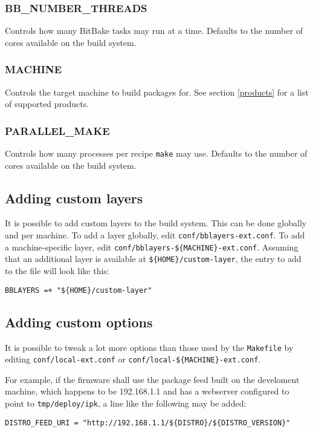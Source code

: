 \documentclass[a4paper]{article}
\newcommand{\shell}[1]{\texttt{\small #1}}
\begin{document}
    \subsubsection{BB\_NUMBER\_THREADS}
      Controls how many BitBake tasks may run at a time. Defaults to the
      number of cores available on the build system.

    \subsubsection{MACHINE}
      Controls the target machine to build packages for. See section \ref{products}
      for a list of supported products.

    \subsubsection{PARALLEL\_MAKE}
      Controls how many processes per recipe \shell{make} may use. Defaults to
      the number of cores available on the build system.

  \subsection{Adding custom layers}
  \label{custom_layers}
     It is possible to add custom layers to the build system. This can be done globally
     and per machine. To add a layer globally, edit \shell{conf/bblayers-ext.conf}. To
     add a machine-specific layer, edit \shell{conf/bblayers-\$\{MACHINE\}-ext.conf}.
     Assuming that an additional layer is available at \shell{\$\{HOME\}/custom-layer},
     the entry to add to the file will look like this:

     \shell{BBLAYERS =+ "\$\{HOME\}/custom-layer"}

  \subsection{Adding custom options}
     It is possible to tweak a lot more options than those used by the
     \shell{Makefile} by editing \shell{conf/local-ext.conf} or \shell{conf/local-\$\{MACHINE\}-ext.conf}.

     For example, if the firmware shall use the package feed built on the develoment machine, which
     happens to be 192.168.1.1 and has a webserver configured to point to \shell{tmp/deploy/ipk},
     a line like the following may be added:

     \shell{DISTRO\_FEED\_URI = "http://192.168.1.1/\$\{DISTRO\}/\$\{DISTRO\_VERSION\}"}
\end{document}
